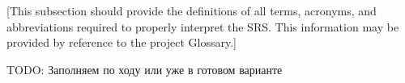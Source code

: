 [This subsection should provide the definitions 
of all terms, acronyms, and abbreviations required 
to properly interpret the SRS.  This information 
may be provided by reference to the project 
Glossary.]

TODO: Заполняем по ходу или уже в готовом варианте